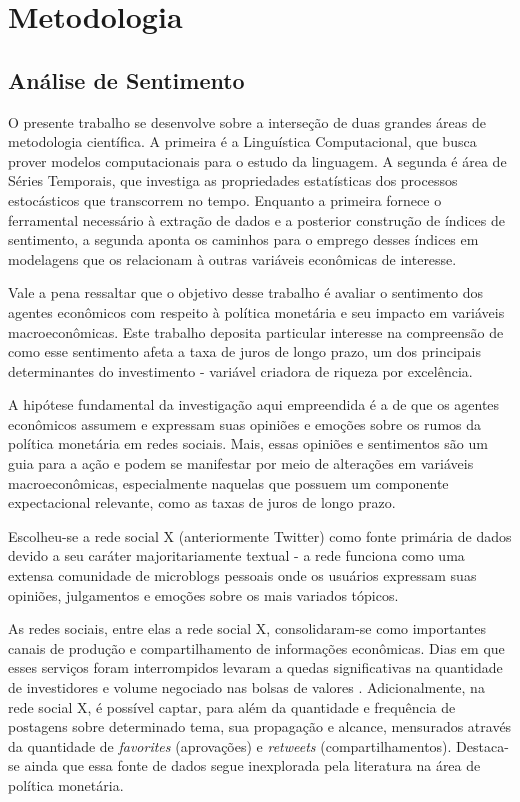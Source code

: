 

\chapter{Metodologia} 
\label{metodologia_analise_sentimento}

\section{Análise de Sentimento}
\bigskip

O presente trabalho se desenvolve sobre a interseção de duas grandes áreas de metodologia científica. A primeira é a Linguística Computacional, que busca prover modelos computacionais para o estudo da linguagem. A segunda é área de Séries Temporais, que investiga as propriedades estatísticas dos processos estocásticos que transcorrem no tempo. Enquanto a primeira fornece o ferramental necessário à extração de dados e a posterior construção de índices de sentimento, a segunda aponta os caminhos para o emprego desses índices em modelagens que os relacionam à outras variáveis econômicas de interesse.

Vale a pena ressaltar que o objetivo desse trabalho é avaliar o sentimento dos agentes econômicos com respeito à política monetária e seu impacto em variáveis macroeconômicas. Este trabalho deposita particular interesse na compreensão de como esse sentimento afeta a taxa de juros de longo prazo, um dos principais determinantes do investimento - variável criadora de riqueza por excelência.

A hipótese fundamental da investigação aqui empreendida é a de que os agentes econômicos assumem e expressam suas opiniões e emoções sobre os rumos da política monetária em redes sociais. Mais, essas opiniões e sentimentos são um guia para a ação e podem se manifestar por meio de alterações em variáveis macroeconômicas, especialmente naquelas que possuem um componente expectacional relevante, como as taxas de juros de longo prazo. 

Escolheu-se a rede social X (anteriormente Twitter) como fonte primária de dados devido a seu caráter majoritariamente textual - a rede funciona como uma extensa comunidade de microblogs pessoais onde os usuários expressam suas opiniões, julgamentos e emoções sobre os mais variados tópicos. 

As redes sociais, entre elas a rede social X, consolidaram-se como importantes canais de produção e compartilhamento de informações econômicas. Dias em que esses serviços foram interrompidos levaram a quedas significativas na quantidade de investidores e volume negociado nas bolsas de valores \parencite{paiva_essays_2022}. Adicionalmente, na rede social X, é possível captar, para além da quantidade e frequência de postagens sobre determinado tema, sua propagação e alcance, mensurados através da quantidade de \textit{favorites} (aprovações) e \textit{retweets} (compartilhamentos). Destaca-se ainda que essa fonte de dados segue inexplorada pela literatura na área de política monetária.


